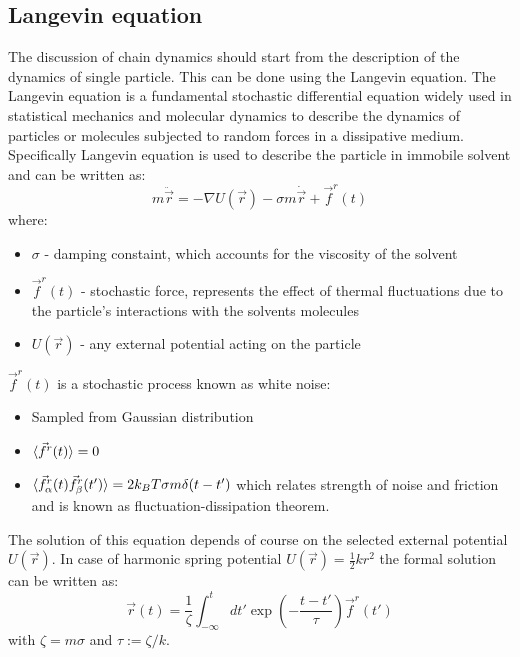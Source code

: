 \documentclass[
    paper=A4,pagesize=automedia,fontsize=12pt,
    BCOR=15mm,DIV=22,
    twoside,headinclude,footinclude=false,
    fleqn,             %
    bibliography=totocnumbered,          %
    listof=totoc,                %
    listof=flat,                 %
    cleardoublepage=empty      %
    numbers=endperiod
]{scrartcl}
\begin{document}
\subsection{Langevin equation} \label{section:langevin_eq}
The discussion of chain dynamics should start from the description of
the dynamics of single particle. This can be done using the Langevin equation. 
The Langevin equation is a fundamental stochastic differential equation 
widely used in statistical mechanics and molecular dynamics to describe the 
dynamics of particles or molecules subjected to random forces in a 
dissipative medium. Specifically Langevin equation is used to describe the 
particle in immobile solvent and can be written as:
\begin{equation} \label{eq:langevin}
    m \ddot{\vec{r}} = - \nabla U(\vec{r}) - \sigma m \dot{\vec{r}} + \vec{f}^r(t)
\end{equation}
where:
\begin{itemize}
    \item $\sigma$ - damping constaint, which accounts for the viscosity of the solvent
    \item $\vec{f}^r(t)$ - stochastic force, represents the effect of thermal 
    fluctuations due to the particle's interactions with the solvents molecules
    \item $U(\vec{r})$ - any external potential acting on the particle
\end{itemize}
$\vec{f}^r(t)$ is a stochastic process known as white noise:
\begin{itemize}
    \item Sampled from Gaussian distribution
    \item $\langle\vec{f}^r(t)\rangle = 0$
    \item $\langle\vec{f}_{\alpha}^r(t) \vec{f}_{\beta}^r(t')\rangle = 2 k_B T \sigma m \delta(t-t')$ which relates strength
     of noise and friction and
    is known as fluctuation-dissipation theorem.
\end{itemize}
The solution of this equation depends of course on the selected external
potential $U(\vec{r})$. In case of harmonic spring potential 
$U(\vec{r})=\frac{1}{2} k r^2$ the formal solution can be written as:
\begin{equation}
    \vec{r}(t)=\frac{1}{\zeta}\int_{-\infty}^{t} dt' \exp\left(-\frac{t-t'}{\tau}\right)\vec{f}^r(t')
\end{equation}
with $\zeta=m \sigma$ and $\tau := \zeta / k$.
\end{document}
